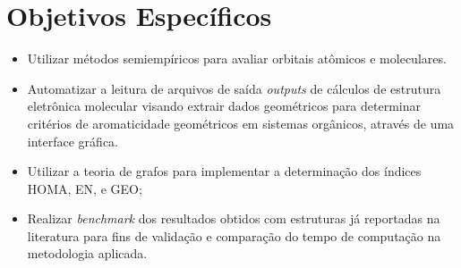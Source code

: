 \section{Objetivos Específicos}

\begin{itemize}
    
    \item Utilizar métodos semiempíricos para avaliar orbitais atômicos e moleculares.
    
    \item Automatizar a leitura de arquivos de saída \textit{outputs} de cálculos de estrutura eletrônica molecular visando extrair dados geométricos para determinar critérios de aromaticidade geométricos em sistemas orgânicos, através de uma interface gráfica.

    \item Utilizar a teoria de grafos para implementar a determinação dos índices HOMA, EN, e GEO; 
    
    \item Realizar \textit{benchmark} dos resultados obtidos com estruturas já reportadas na literatura para fins de  validação e comparação do tempo de computação na metodologia aplicada.
\end{itemize}